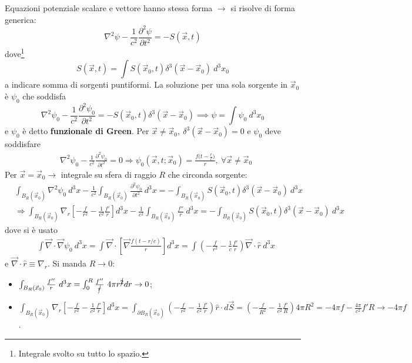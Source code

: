 \documentclass[a4paper]{scrartcl}
\numberwithin{equation}{subsection}
\theoremstyle{style1}
\begin{document}
Equazioni potenziale scalare e vettore hanno stessa forma $\to$ si risolve di forma generica:
\begin{equation}
	\nabla ^2 \psi  - \frac{1}{c^2}\frac{\partial ^2 \psi }{\partial t^2} = - S(\vec{x},t) 
\end{equation}
dove\footnote{Integrale svolto su tutto lo spazio.}
\begin{equation}
S(\vec{x},t) = \int S(\vec{x}_0,t) \delta ^3(\vec{x}-\vec{x}_0) \ d^3 x_0
\end{equation}
a indicare somma di sorgenti puntiformi. La soluzione per una sola sorgente in $\vec{x}_0$ \`e $\psi _0$ che soddisfa 
\[
\nabla ^2 \psi _0 - \frac{1}{c^2}\frac{\partial ^2 \psi_0}{\partial t^2} = -S(\vec{x}_0,t) \delta ^3 (\vec{x}-\vec{x}_0) \implies \psi =\int\psi _0 \ d^3 x_0 
\] 
e $\psi _0$ \`e detto \textbf{funzionale di Green}. Per $\vec{x}\neq \vec{x}_0, \ \delta ^3 (\vec{x}-\vec{x}_0) = 0$ e $\psi _0$ deve soddisfare
\begin{equation}
	\begin{split}
		&\nabla ^2 \psi _0 - \frac{1}{c^2}\frac{\partial ^2\psi _0}{\partial t^2} = 0\Rightarrow \psi _0(\vec{x},t;\vec{x}_0) = \frac{f\big(t - \frac{r}{c}\big) }{r}, \ \forall \vec{x}\neq \vec{x}_0 
	\end{split}
\end{equation}
Per $\vec{x}=\vec{x}_0 \to$ integrale su sfera di raggio $R$ che circonda sorgente:
\[
\begin{split}
	&\int_{B_R(\vec{x}_0)} \nabla ^2 \psi _0 \ d^3 x  - \frac{1}{c^2}\int_{B_R (\vec{x}_0)}  \frac{\partial ^2 \psi _0}{\partial t^2} \ d^3 x = - \int_{B_R(\vec{x}_0)} S(\vec{x}_0,t) \delta ^3 (\vec{x}-\vec{x}_0) \ d^3 x\\
	&\Rightarrow \int_{B_R(\vec{x}_0)} \nabla _r \left[ - \frac{f}{r^2}-\frac{1}{c^2}\frac{f'}{r} \right] d^3 x - \frac{1}{c^2}\int_{B_R(\vec{x}_0)} \frac{f''}{r}\ d^3 x = - \int_{B_R(\vec{x}_0)} S(\vec{x}_0, t) \delta ^3(\vec{x}-\vec{x}_0) \ d^3 x
\end{split}
\] 
dove si \`e usato 
\[
\begin{split}
	& \int \vec{\nabla }\cdot \vec{\nabla }\psi _0 \ d^3 x = \int \vec{\nabla }\cdot \left[ \vec{\nabla } \frac{f(t- r / c)}{r} \right] d^3 x= \int \left(-\frac{f}{r^2}-\frac{1}{c}\frac{f'}{r}\right) \vec{\nabla }\cdot \hat{r} \ d^3 x
\end{split}
\] 
e $\vec{\nabla }\cdot \hat{r}\equiv \nabla _r$. Si manda $R\to 0$:
\begin{itemize}
	\item $\int_{B_R(\vec{x}_0)} \frac{f''}{r}\ d^3 x = \int_{0} ^R \frac{f''}{\cancel{r}} \ 4\pi r^{\cancel{2}} dr \to 0$;
	\item $\int_{B_R(\vec{x}_0)} \nabla _r \left[ - \frac{f}{r^2}-\frac{1}{c^2}\frac{f'}{r} \right] d^3 x = \int_{\partial B_R(\vec{x}_0)} \left(-\frac{f}{r^2}- \frac{1}{c^2}\frac{f'}{r}\right) \hat{r}\cdot d\vec{S}= \left(-\frac{f}{R^2}-\frac{1}{c^2}\frac{f'}{R}\right) 4\pi R^2 = - 4 \pi f - \frac{4\pi}{c^2}f' R \to - 4\pi f $.
\end{itemize}
\end{document}

